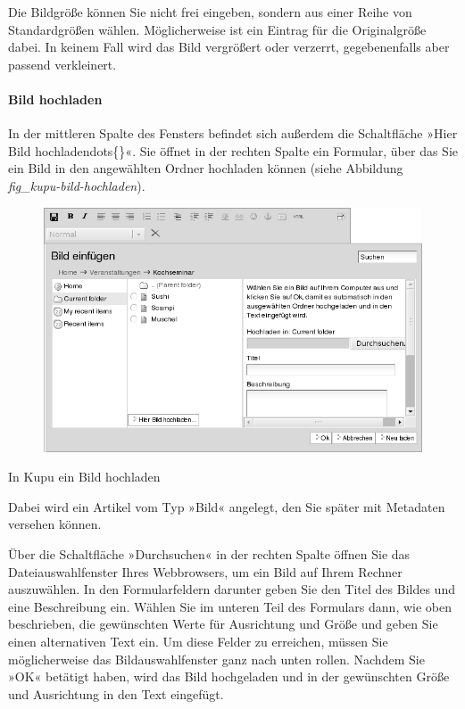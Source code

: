 \documentclass[a4paper,12pt,ngerman]{manual}
\begin{document}
Die Bildgröße können Sie nicht frei eingeben, sondern aus einer Reihe von
Standardgrößen wählen. Möglicherweise ist ein Eintrag für die Originalgröße
dabei. In keinem Fall wird das Bild vergrößert oder verzerrt, gegebenenfalls
aber passend verkleinert.
\hypertarget{sec-kupu-bild-hochladen}{}

\paragraph{Bild hochladen}

In der mittleren Spalte des Fensters befindet sich außerdem die Schaltfläche
»Hier Bild hochladendots\{\}«. Sie öffnet in der rechten Spalte ein Formular,
über das Sie ein Bild in den angewählten Ordner hochladen können (siehe
Abbildung \emph{fig\_kupu-bild-hochladen}).
\begin{figure}[htbp]
\centering

\includegraphics{hier-bild-hochladen.png}
\end{figure}

In Kupu ein Bild hochladen

Dabei wird ein Artikel vom Typ »Bild« angelegt, den Sie später mit Metadaten
versehen können.

Über die Schaltfläche »Durchsuchen« in der rechten Spalte öffnen Sie das
Dateiauswahlfenster Ihres Webbrowsers, um ein Bild auf Ihrem Rechner
auszuwählen. In den Formularfeldern darunter geben Sie den Titel des Bildes
und eine Beschreibung ein. Wählen Sie im unteren Teil des Formulars dann, wie
oben beschrieben, die gewünschten Werte für Ausrichtung und Größe und geben
Sie einen alternativen Text ein. Um diese Felder zu erreichen, müssen Sie
möglicherweise das Bildauswahlfenster ganz nach unten rollen. Nachdem Sie »OK«
betätigt haben, wird das Bild hochgeladen und in der gewünschten Größe und
Ausrichtung in den Text eingefügt.
\end{document}

